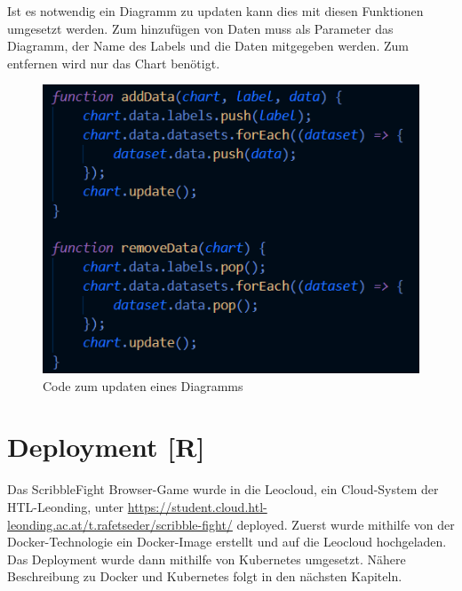 Ist es notwendig ein Diagramm zu updaten kann dies mit diesen Funktionen umgesetzt werden. Zum hinzufügen
von Daten muss als Parameter das Diagramm, der Name des Labels und die Daten mitgegeben werden. Zum entfernen wird nur das Chart benötigt.
\begin{figure}[H]
    \centering
    \includegraphics[scale=1]{pics/updateChart.png}
    \caption{Code zum updaten eines Diagramms}
\end{figure}




\section{Deployment [R]}
Das ScribbleFight Browser-Game wurde in die Leocloud, ein Cloud-System der HTL-Leonding, unter \url{https://student.cloud.htl-leonding.ac.at/t.rafetseder/scribble-fight/} deployed.
Zuerst wurde mithilfe von der Docker-Technologie ein Docker-Image erstellt und auf die Leocloud hochgeladen. Das Deployment wurde dann mithilfe von Kubernetes umgesetzt.
Nähere Beschreibung zu Docker und Kubernetes folgt in den nächsten Kapiteln.
